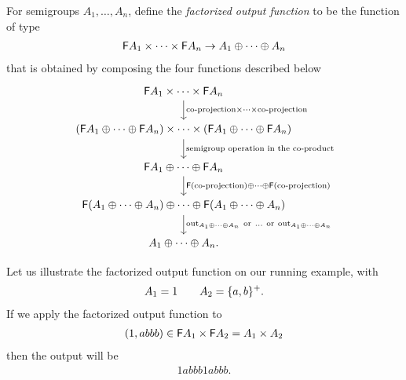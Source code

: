 For semigroups $A_1,\ldots,A_n$, define the \emph{factorized output function} to be the 
function of type 
\begin{align*}
\mathsf F A_1 \times \cdots \times \mathsf F A_n \to A_1 \oplus \cdots \oplus A_n
\end{align*}
that is obtained by composing the  four functions described below
\[
\begin{tikzcd}
\functor A_1 \times \cdots \times \functor A_n
\ar[d,"\text{co-projection} \times \cdots \times \text{co-projection}"]
\\
(\functor A_1 \oplus \cdots \oplus \functor A_n)
\times
\cdots
\times 
(\functor A_1 \oplus \cdots \oplus \functor A_n)
\ar[d,"\text{semigroup operation in the co-product}"]
\\
\functor A_1 \oplus \cdots \oplus \functor A_n
\ar[d, "\functor (\text{co-projection}) \oplus \cdots \oplus \functor (\text{co-projection}) "]\\
\functor (A_1 \oplus \cdots \oplus A_n) \oplus \cdots \oplus \functor (A_1 \oplus \cdots \oplus A_n)
\ar[d, "\outfun_{A_1 \oplus \cdots \oplus A_n}\ \text{or}\ \dots\ \text{or}\ \outfun_{A_1 \oplus \cdots \oplus A_n}"]\\ 
A_1 \oplus \cdots \oplus A_n.
\end{tikzcd}
\]

Let us illustrate the factorized output function on our running example, with 
\begin{align*}
A_1 = 1 \qquad A_2 = \{a,b\}^+.
\end{align*}
If we apply the factorized output function to 
\begin{align*}
(1, abbb)  \in \mathsf F A_1 \times \mathsf F A_2 = A_1 \times A_2
\end{align*}
then the output will be 
\begin{align*}
1 abbb 1 abbb.
\end{align*}

